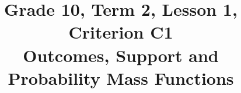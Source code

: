 \makeatletter
{}
\makeatother



\CoordinatedTermTwoPalette

\usepackage{needspace}
\setlength{\emergencystretch}{2em}
\title{Grade 10, Term 2, Lesson 1, Criterion C1\\Outcomes, Support and Probability Mass Functions}
\author{}
\date{}
\newcommand{\taskheading}[1]{%
    \textbf{Task #1. \ifcase#1\or
    Identify the outcomes and their probabilities.\or
    Define variables and units; map, list support, build and check PMFs.\or
    Find and interpret a requested probability.\fi}%
}
\newcommand{\problemTasks}[5]{%
    \Needspace{10\baselineskip}%
    \QuestionsTasks[#1]{%
        {1}/{#2-1}/{\taskheading{1} #3},
        {1}/{#2-2}/{\taskheading{2} #4},
        {1}/{#2-3}/{\taskheading{3} #5}%
    }%
}
\newcommand{\contextTasks}[4]{%
    \TaskHyperref{#1-1}{\taskheading{1}} #2\par\smallskip
    \TaskHyperref{#1-2}{\taskheading{2}} #3\par\smallskip
    \TaskHyperref{#1-3}{\taskheading{3}} #4%
}
\newcommand{\workedsolution}[1]{%
    \Needspace{8\baselineskip}%
    \subsubsection*{Complete worked solution}\label{#1}%
}
\newcommand{\solutiontask}[2]{%
    \par\medskip\Needspace{5\baselineskip}\phantomsection\label{#1-#2}%
    \noindent\taskheading{#2}\par\nopagebreak
}

